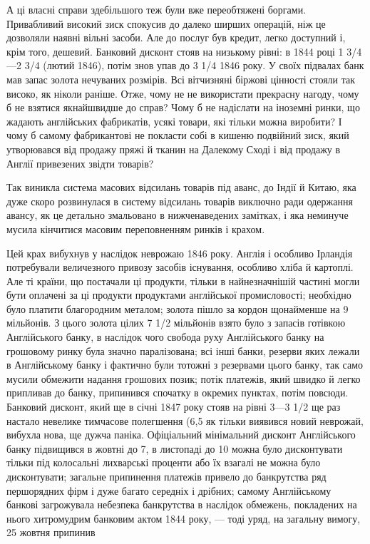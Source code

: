 А ці власні справи здебільшого теж були вже переобтяжені боргами. Привабливий високий зиск спокусив
до далеко
ширших операцій, ніж це дозволяли наявні вільні засоби. Але до
послуг був кредит, легко доступний і, крім того, дешевий. Банковий дисконт стояв на низькому рівні:
в 1844 році 1 3/4—2 3/4%
(лютий 1846), потім знов упав до 3 1/4%
1846 року. У своїх підвалах банк мав запас золота нечуваних
розмірів. Всі вітчизняні біржові цінності стояли так високо, як ніколи раніше. Отже, чому не не
використати прекрасну нагоду,
чому б не взятися якнайшвидше до справ? Чому б не надіслати
на іноземні ринки, що жадають англійських фабрикатів, усякі
товари, які тільки можна виробити? І чому б самому фабрикантові не покласти собі в кишеню подвійний
зиск, який утворювався від продажу пряжі й тканин на Далекому Сході і від
продажу в Англії привезених звідти товарів?

Так виникла система масових відсилань товарів під аванс, до
Індії й Китаю, яка дуже скоро розвинулася в систему відсилань
товарів виключно ради одержання авансу, як це детально змальовано в нижченаведених замітках, і яка
неминуче мусила кінчитися масовим переповненням ринків і крахом.

Цей крах вибухнув у наслідок неврожаю 1846 року. Англія
і особливо Ірландія потребували величезного привозу засобів
існування, особливо хліба й картоплі. Але ті країни, що постачали ці продукти, тільки в
найнезначнішій частині могли бути
оплачені за ці продукти продуктами англійської промисловості;
необхідно було платити благородним металом; золота пішло за
кордон щонайменше на 9 мільйонів. З цього золота цілих
7 1/2 мільйонів взято було з запасів готівкою Англійського банку,
в наслідок чого свобода руху Англійського банку на грошовому
ринку була значно паралізована; всі інші банки, резерви яких
лежали в Англійському банку і фактично були тотожні з резервами цього банку, так само мусили
обмежити надання грошових
позик; потік платежів, який швидко й легко припливав до банку,
припинився спочатку в окремих пунктах, потім повсюди. Банковий дисконт, який ще в січні 1847 року
стояв на рівні 3—3 1/2%
ще раз настало невелике тимчасове полегшення (6,5%
як тільки виявився новий неврожай, вибухла нова, ще дужча паніка. Офіціальний мінімальний дисконт
Англійського банку підвищився в жовтні до 7, в листопаді до 10%
можна було дисконтувати тільки під колосальні
лихварські проценти або їх взагалі не можна було дисконтувати;
загальне припинення платежів привело до банкрутства ряд першорядних фірм і дуже багато середніх і
дрібних; самому Англійському банкові загрожувала небезпека банкрутства в наслідок
обмежень, покладених на нього хитромудрим банковим актом
1844 року, — тоді уряд, на загальну вимогу, 25 жовтня припинив
